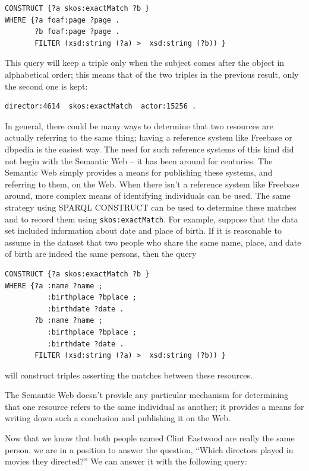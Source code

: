 \begin{challenge}
\begin{lstlisting}
CONSTRUCT {?a skos:exactMatch ?b }
WHERE {?a foaf:page ?page .
       ?b foaf:page ?page .
       FILTER (xsd:string (?a) >  xsd:string (?b)) }
\end{lstlisting}


This query will keep a triple only when the subject comes after the
object in alphabetical order; this means that of the two triples in the
previous result, only the second one is kept:

\begin{lstlisting}
director:4614  skos:exactMatch  actor:15256 .
\end{lstlisting}

In general, there could be many ways to determine that two resources are
actually referring to the same thing; having a reference system like
Freebase or dbpedia is the easiest way. The need for such reference systems of this
kind did not begin with the Semantic Web -- it has been around for
centuries. The Semantic Web simply provides a means for publishing these
systems, and referring to them, on the Web. When there isn't a reference
system like Freebase around, more complex means of identifying
individuals can be used. The same strategy using SPARQL CONSTRUCT can be
used to determine these matches and to record them using
\texttt{skos:exactMatch}. For example, suppose that the data set included
information about date and place of birth. If it is reasonable to assume
in the dataset that two people who share the same name, place, and date
of birth are indeed the same persons, then the query

\begin{lstlisting}
CONSTRUCT {?a skos:exactMatch ?b }
WHERE {?a :name ?name ;
          :birthplace ?bplace ;
          :birthdate ?date .
       ?b :name ?name ;
          :birthplace ?bplace ;
          :birthdate ?date .
       FILTER (xsd:string (?a) >  xsd:string (?b)) }
\end{lstlisting}

will construct triples asserting the matches between these resources.

The Semantic Web doesn't provide any particular mechanism for
determining that one resource refers to the same individual as another;
it provides a means for writing down such a conclusion and publishing it
on the Web.

Now that we know that both people named Clint Eastwood are really the
same person, we are in a position to answer the question, ``Which
directors played in movies they directed?'' We can answer it with the
following query:


\end{challenge}
